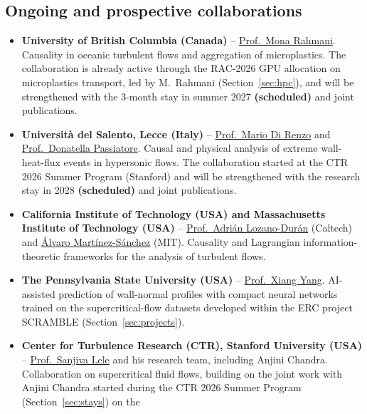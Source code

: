 \documentclass[11pt]{article}
\newcommand{\NEW}[1]{\iffinal #1\else{\color{red}#1}\fi} %
\begin{document}
\subsection{Ongoing \NEW{and prospective} collaborations}\label{sec:collab}
\begin{itemize}
  \item \textbf{University of British Columbia (Canada)} --
  \href{https://chbe.ubc.ca/mona-rahmani/}{Prof.\ Mona Rahmani}. Causality in oceanic
  turbulent flows and aggregation of microplastics. The collaboration is already active
  through the RAC-2026 GPU allocation on microplastics transport, led by M.\ Rahmani
  (Section~\ref{sec:hpc}), and will be strengthened with the 3-month stay in summer 2027 \textbf{(scheduled)}
  and joint publications.
  \item \textbf{Universit\`a del Salento, Lecce (Italy)} --
  \href{https://www.unisalento.it/scheda-utente/-/people/mario.direnzo}{Prof.\ Mario Di Renzo}
  and \href{https://www.unisalento.it/scheda-utente/-/people/donatella.passiatore}{Prof.\ Donatella Passiatore}.
  Causal and physical analysis of extreme wall-heat-flux events in hypersonic flows. The
  collaboration started at the CTR 2026 Summer Program (Stanford) and will be strengthened
  with the research stay in 2028 \textbf{(scheduled)} and joint publications.
  \item \textbf{California Institute of Technology (USA) and Massachusetts Institute of
  Technology (USA)} --
  \href{https://www.eas.caltech.edu/people/adrian-lozano-duran}{Prof.\ Adri\'an
  Lozano-Dur\'an} (Caltech) and
  \href{https://sites.google.com/view/alvaro-martinez-sanchez/about-me}{\'Alvaro
  Mart\'inez-S\'anchez} (MIT). Causality and Lagrangian information-theoretic frameworks
  for the analysis of turbulent flows.
  \item \textbf{The Pennsylvania State University (USA)} --
  \href{https://www.me.psu.edu/department/directory-detail-g.aspx?q=xzy48}{Prof.\ Xiang
  Yang}. AI-assisted prediction of wall-normal profiles with compact neural networks
  trained on the supercritical-flow datasets developed within the ERC project SCRAMBLE
  (Section~\ref{sec:projects}).
  \item \textbf{Center for Turbulence Research (CTR), Stanford University (USA)} --
  \href{https://me.stanford.edu/people/sanjiva-lele}{Prof.\ Sanjiva Lele} and his research team,
  including Anjini Chandra. Collaboration on supercritical fluid flows, building on the joint work
  with Anjini Chandra started during the CTR 2026 Summer Program (Section~\ref{sec:stays}) on the

\end{itemize}
\end{document}
